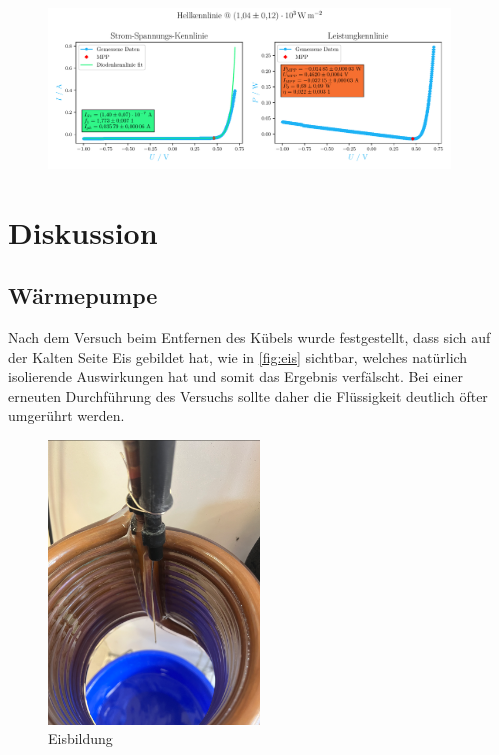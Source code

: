 \documentclass[12pt,english,ngerman]{scrartcl}
\begin{document}
\begin{figure}[H]
	\centering
	\includegraphics[width=0.95\textwidth]{figures/hellled.pdf}
	\caption{}\label{fig:ausw_kennlinie_hell_led}
\end{figure}

\section{Diskussion}\label{sec:diskussion}

\subsection{Wärmepumpe}


Nach dem Versuch beim Entfernen des Kübels wurde festgestellt, dass sich auf der Kalten Seite Eis gebildet hat,
wie in \autoref{fig:eis} sichtbar,
welches natürlich isolierende Auswirkungen hat und somit das Ergebnis verfälscht. Bei einer erneuten Durchführung 
des Versuchs sollte daher die Flüssigkeit deutlich öfter umgerührt werden.

\begin{figure}[H]
	\centering
	\includegraphics[width=0.5\textwidth]{figures/eis.PNG}
	\caption{Eisbildung}\label{fig:eis}
\end{figure}
\end{document}
